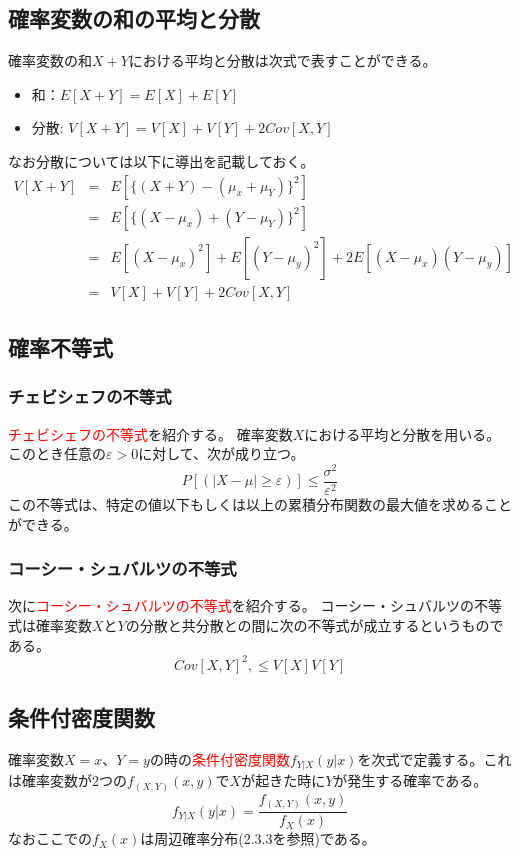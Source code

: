 \documentclass[a4paper,10pt]{jarticle}
\begin{document}
\subsection{確率変数の和の平均と分散}
確率変数の和$X+Y$における平均と分散は次式で表すことができる。
\begin{itemize}
    \item 和：$E[X+Y] = E[X]+E[Y]$
    \item 分散: $V[X+Y] = V[X]+V[Y] + 2Cov[X,Y]$
\end{itemize}
なお分散については以下に導出を記載しておく。
\begin{eqnarray*}
    V[X+Y] &=& E[\{(X+Y)-(\mu_x+\mu_Y)\}^2]\\
            &=& E[\{(X-\mu_x)+(Y-\mu_Y)\}^2]\\
            &=& E[(X-\mu_x)^2]+E[(Y-\mu_y)^2]+2E[(X-\mu_x)(Y-\mu_y)]\\
            &=& V[X]+V[Y]+2Cov[X,Y]
\end{eqnarray*}
\subsection{確率不等式}
\subsubsection{チェビシェフの不等式}
\textcolor{red}{チェビシェフの不等式}を紹介する。
確率変数$X$における平均と分散を用いる。このとき任意の$\varepsilon >0$に対して、次が成り立つ。
\begin{equation}
    P[(|X-\mu|\geq\varepsilon)]\leq \frac{\sigma^2}{\varepsilon^2}\tag{2,20}
\end{equation}
この不等式は、特定の値以下もしくは以上の累積分布関数の最大値を求めることができる。
\subsubsection{コーシー・シュバルツの不等式}
次に\textcolor{red}{コーシー・シュバルツの不等式}を紹介する。
コーシー・シュバルツの不等式は確率変数$X$と$Y$の分散と共分散との間に次の不等式が成立するというものである。
\begin{equation}
    Cov[X,Y] ^2,\leq V[X]V[Y]\tag{2,21}
\end{equation}
\subsection{条件付密度関数}
確率変数$X=x$、$Y=y$の時の\textcolor{red}{条件付密度関数}$f_{Y|X}(y|x)$を次式で定義する。これは確率変数が2つの$f_{(X,Y)}(x,y)$で$X$が起きた時に$Y$が発生する確率である。
\begin{equation}
    f_{Y|X}(y|x)=\frac{f_{(X,Y)}(x,y)}{f_X(x)}\tag{2,22}
\end{equation}
なおここでの$f_X(x)$は周辺確率分布(2.3.3を参照)である。
\end{document}
